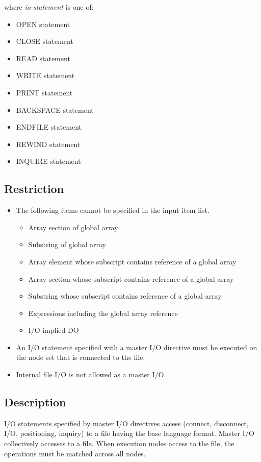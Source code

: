    where {\it io-statement} is one of:

   \begin{itemize}
    \item OPEN statement
    \item CLOSE statement
    \item READ statement
    \item WRITE statement
    \item PRINT statement
    \item BACKSPACE statement
    \item ENDFILE statement
    \item REWIND statement
    \item INQUIRE statement
   \end{itemize}

   \subsection*{Restriction}
   \begin{itemize}
    \item The following items cannot be specified in the input item list.

	  \begin{itemize}
	   \item Array section of global array
	   \item Substring of global array
	   \item Array element whose subscript contains reference of a
		 global array
	   \item Array section whose subscript contains reference of a
		 global array
	   \item Substring whose subscript contains reference of a
		 global array
	   \item Expressions including the global array reference
	   \item I/O implied DO
	  \end{itemize}

    \item An I/O statement specified with a master I/O directive must be
	  executed on the node set that is connected to the file.
    \item Internal file I/O is not allowed as a master I/O.
   \end{itemize}
	  
  \subsection{Description}
   I/O statements specified by master I/O directives access (connect,
   disconnect, I/O, positioning, inquiry)   to a file having
   the base language format.
   Master I/O collectively accesses to a file.
   When execution nodes access to the file, the operations must be
   matched across all nodes.

